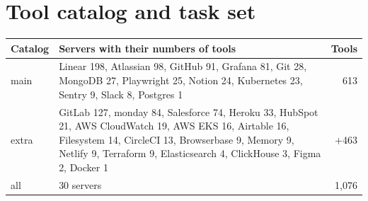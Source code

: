 \documentclass[11pt]{article}
\begin{document}
\section{Tool catalog and task set}\label{app:catalog}
{\centering\footnotesize
{}
\label{tab:catalog}
\setlength{\tabcolsep}{3.5pt}
\begin{tabularx}{\linewidth}{@{}l X r@{}}
\toprule
Catalog & Servers with their numbers of tools & Tools \\
\midrule
main & Linear 198, Atlassian 98, GitHub 91, Grafana 81, Git 28, MongoDB 27, Playwright 25, Notion 24, Kubernetes 23,
Sentry 9, Slack 8, Postgres 1 & 613 \\
extra & GitLab 127, monday 84, Salesforce 74, Heroku 33, HubSpot 21, AWS CloudWatch 19, AWS EKS 16, Airtable 16,
Filesystem 14, CircleCI 13, Browserbase 9, Memory 9, Netlify 9, Terraform 9, Elasticsearch 4, ClickHouse 3, Figma 2,
Docker 1 & +463 \\
\midrule
all & 30 servers & 1{,}076 \\
\bottomrule
\end{tabularx}
\par}
\bigskip
{\small

}
\end{document}

